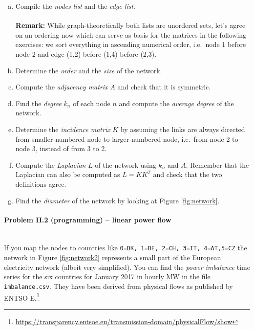 \documentclass[11pt,a4paper,fleqn]{scrartcl}
\begin{document}
\begin{enumerate}[(a)]
 \item Compile the \textit{nodes list} and the \textit{edge list}.\\~\\
       \textbf{Remark:} While graph-theoretically both lists are unordered sets, let's agree on an ordering now which can serve as basis for the matrices in the following exercises: we sort everything in ascending numerical order, i.e.\ node 1 before node 2 and edge (1,2) before (1,4) before (2,3).
 \item Determine the \textit{order} and the \textit{size} of the network.
 \item Compute the\textit{ adjacency matrix} $A$ and check that it is symmetric.
 \item Find the \textit{degree} $k_n$ of each node $n$ and compute the \textit{average degree} of the network.
 \item Determine the \textit{incidence matrix} $K$ by assuming the links are always directed from smaller-numbered node to larger-numbered node, i.e.\ from node 2 to node 3, instead of from 3 to 2.
 \item Compute the \textit{Laplacian} $L$ of the network using $k_n$ and $A$. Remember that the Laplacian can also be computed as $L=KK^T$ and check that the two definitions agree.
 \item Find the \textit{diameter} of the network by looking at Figure \ref{fig:network}.

\end{enumerate}

\pagebreak
\paragraph{Problem II.2 (programming) -- linear power flow \faGroup}~\\



If you map the nodes to countries like \texttt{0=DK, 1=DE, 2=CH, 3=IT, 4=AT,5=CZ} the network in Figure \ref{fig:network2} represents a small part of the European electricity network (albeit very simplified). You can find the \textit{power imbalance} time series for the six countries for January 2017 in hourly MW in the file \texttt{imbalance.csv}. They have been derived from physical flows as published by ENTSO-E.\footnote{\url{https://transparency.entsoe.eu/transmission-domain/physicalFlow/show}}\\
\end{document}
